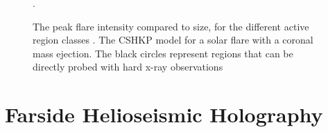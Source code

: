 \documentclass[11pt,a4paper,onecolumn]{report}
\begin{document}
\begin{figure}[t]%
  \centering
  \qquad
  \caption{ The peak flare intensity compared to
  size, for the different active region classes \citep{sammis_dependence_2000}.
   The CSHKP model for a solar flare with a coronal mass
  ejection. The black circles represent regions that can be directly probed with
  hard x-ray observations \citep{Christe2017}}.
\end{figure}







\section{Farside Helioseismic Holography}
\label{sec:FHSM}

\end{document}
